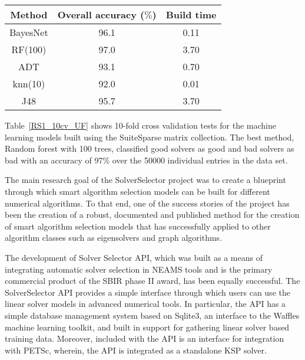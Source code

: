 \begin{table*}[h]
\centering
\caption{Convergence model accuracy and build time for 10-fold cross validation with SuiteSparse data set.}
\label{RS1_10cv_UF}
\begin{tabular}{|c|c|c|}    \hline  

Method                & Overall accuracy ($\%$)  & Build time \\ \hline\hline
BayesNet              &	96.1                    & 0.11	\\ \hline	    
RF(100)   &           97.0                    & 3.70	\\ \hline      
ADT                              &  93.1	                & 0.70	\\ \hline  
knn(10)                             &	92.0                    & 0.01	\\ \hline	    
J48                           &	95.7                    & 3.70	\\ \hline 	    
\end{tabular}
\end{table*}


Table~\ref{RS1_10cv_UF} shows 10-fold cross validation tests for the machine learning models built using the SuiteSparse matrix collection. The best method, Random forest with 100 trees, classified good solvers as good and bad solvers as bad with an accuracy of 97\% over the 50000 individual entries in the data set. 

The main research goal of the SolverSelector project was to create a blueprint through which smart algorithm selection models can be built for different numerical algorithms. To that end, one of the success stories of the project has been the creation of a robust, documented and published method for the creation of smart algorithm selection models that has successfully applied to other algorithm classes such as eigensolvers and graph algorithms.   

The development of Solver Selector API, which was built as a means of integrating automatic solver selection in NEAMS tools and is the primary commercial product of the SBIR phase II award, has been equally successful. The SolverSelector API provides a simple interface through which users can use the linear solver models in advanced numerical tools. In particular, the API has a simple database management system based on Sqlite3, an interface to the Waffles machine learning toolkit, and built in support for gathering linear solver based training data. Moreover, included with the API is an interface for integration with PETSc, wherein, the API is integrated as a standalone KSP solver. 


